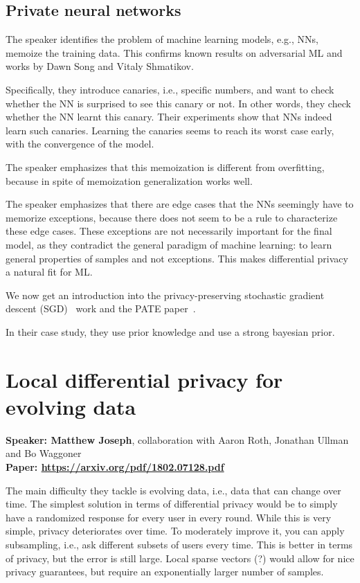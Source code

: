 \documentclass{article}
\begin{document}
\subsection{Private neural networks}
The speaker identifies the problem of machine learning models, e.g., NNs, memoize the training data. This confirms known results on adversarial ML and works by Dawn Song and Vitaly Shmatikov.

Specifically, they introduce canaries, i.e., specific numbers, and want to check whether the NN is surprised to see this canary or not. In other words, they check whether the NN learnt this canary. Their experiments show that NNs indeed learn such canaries. Learning the canaries seems to reach its worst case early, with the convergence of the model.

The speaker emphasizes that this memoization is different from overfitting, because in spite of memoization generalization works well.

The speaker emphasizes that there are edge cases that the NNs seemingly have to memorize exceptions, because there does not seem to be a rule to characterize these edge cases. These exceptions are not necessarily important for the final model, as they contradict the general paradigm of machine learning: to learn general properties of samples and not exceptions. This makes differential privacy a natural fit for ML.

We now get an introduction into the privacy-preserving stochastic gradient descent (SGD)~\cite{abadiSGD} work and the PATE paper~\cite{PATE}.

In their case study, they use prior knowledge and use a strong bayesian prior.



\section{Local differential privacy for evolving data}
\noindent\textbf{Speaker: Matthew Joseph}, collaboration with Aaron Roth, Jonathan Ullman and Bo Waggoner\\
\noindent\textbf{Paper: \url{https://arxiv.org/pdf/1802.07128.pdf}}

The main difficulty they tackle is evolving data, i.e., data that can change over time. The simplest solution in terms of differential privacy would be to simply have a randomized response for every user in every round. While this is very simple, privacy deteriorates over time. To moderately improve it, you can apply subsampling, i.e., ask different subsets of users every time. This is better in terms of privacy, but the error is still large.
Local sparse vectors (?) would allow for nice privacy guarantees, but require an exponentially larger number of samples.
\end{document}
